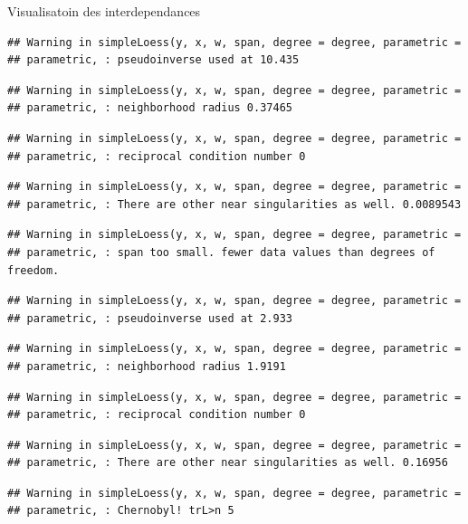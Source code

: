 \documentclass[11pt,ignorenonframetext,]{beamer}
\begin{document}
\begin{frame}[fragile]{Visualisatoin des interdependances}
\begin{verbatim}
## Warning in simpleLoess(y, x, w, span, degree = degree, parametric =
## parametric, : pseudoinverse used at 10.435
\end{verbatim}

\begin{verbatim}
## Warning in simpleLoess(y, x, w, span, degree = degree, parametric =
## parametric, : neighborhood radius 0.37465
\end{verbatim}

\begin{verbatim}
## Warning in simpleLoess(y, x, w, span, degree = degree, parametric =
## parametric, : reciprocal condition number 0
\end{verbatim}

\begin{verbatim}
## Warning in simpleLoess(y, x, w, span, degree = degree, parametric =
## parametric, : There are other near singularities as well. 0.0089543
\end{verbatim}

\begin{verbatim}
## Warning in simpleLoess(y, x, w, span, degree = degree, parametric =
## parametric, : span too small. fewer data values than degrees of freedom.
\end{verbatim}

\begin{verbatim}
## Warning in simpleLoess(y, x, w, span, degree = degree, parametric =
## parametric, : pseudoinverse used at 2.933
\end{verbatim}

\begin{verbatim}
## Warning in simpleLoess(y, x, w, span, degree = degree, parametric =
## parametric, : neighborhood radius 1.9191
\end{verbatim}

\begin{verbatim}
## Warning in simpleLoess(y, x, w, span, degree = degree, parametric =
## parametric, : reciprocal condition number 0
\end{verbatim}

\begin{verbatim}
## Warning in simpleLoess(y, x, w, span, degree = degree, parametric =
## parametric, : There are other near singularities as well. 0.16956
\end{verbatim}

\begin{verbatim}
## Warning in simpleLoess(y, x, w, span, degree = degree, parametric =
## parametric, : Chernobyl! trL>n 5


\end{verbatim}
\end{frame}
\end{document}
